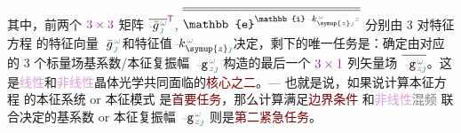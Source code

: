 其中，前两个 $\textcolor{Plum}{3 \times 3}$ 矩阵 $\overline{\xint{{}^{}_{\mathcolor{gray}{-}}}{10}{\bar{g}}^{\;\!\mathcolor{gray}{\omega}}_{\;\! \textcolor{PineGreen}{\jmath}}}^{\mathsf{\textcolor{Plum}{T}}}$, $\overline{\overline{\mathbb{e}^{\mathbb{i} \xint{\begin{smallmatrix} ~ \\ {}^{}_{\mathcolor{gray}{-}} \\ ~ \end{smallmatrix}}{15}{k}_{\symup{z} \textcolor{PineGreen}{\jmath}}^{\;\! \mathcolor{gray}{\omega}} \mathcolor{gray}{z}}}}$ 分别由 3 对\textcolor{PineGreen}{特征方程}  的\textcolor{PineGreen}{特征向量} $\xint{{}^{}_{\mathcolor{gray}{-}}}{10}{\bar{g}}^{\;\!\mathcolor{gray}{\omega}}_{\;\! \textcolor{PineGreen}{\jmath}}$和\textcolor{PineGreen}{特征值}$\xint{\begin{smallmatrix} ~ \\ {}^{}_{\mathcolor{gray}{-}} \\ ~ \end{smallmatrix}}{15}{k}_{\symup{z} \textcolor{PineGreen}{\jmath}}^{\;\! \mathcolor{gray}{\omega}}$决定，剩下的唯一任务是：确定由对应的 3 个标量场\textcolor{PineGreen}{基系数}/\textcolor{PineGreen}{本征复振幅} $\xint{\begin{smallmatrix} ~ \\ {}^{}_{\mathcolor{gray}{-}} \\ ~ \end{smallmatrix}}{09}{\mathtt{g}}^{\;\!\mathcolor{gray}{\omega}}_{\;\! \mathcolor{gray}{z} \textcolor{PineGreen}{\jmath}}$ 构造的最后一个 $\textcolor{Plum}{3 \times 1}$ 列矢量场 $\overline{\xint{\begin{smallmatrix} ~ \\ {}^{}_{\mathcolor{gray}{-}} \\ ~ \end{smallmatrix}}{09}{\mathtt{g}}^{\;\!\mathcolor{gray}{\omega}}_{\;\! \mathcolor{gray}{z} \textcolor{PineGreen}{\jmath}}}$。这是\textcolor{Plum}{线性}和\textcolor{Plum}{非线性}\textcolor{PineGreen}{晶体光学}共同面临的\textcolor{Maroon}{核心之二}。--- 也就是说，如果说计算\textcolor{PineGreen}{本征方程}  的\textcolor{PineGreen}{本征系统} or \textcolor{PineGreen}{本征模}式  是\textcolor{Maroon}{首要任务}，那么计算满足\textcolor{Maroon}{边界条件}  和\textcolor{Plum}{非线性}\textcolor{gray}{混频}  联合决定的\textcolor{PineGreen}{基系数} or \textcolor{PineGreen}{本征复振幅} $\xint{\begin{smallmatrix} ~ \\ {}^{}_{\mathcolor{gray}{-}} \\ ~ \end{smallmatrix}}{09}{\mathtt{g}}^{\;\!\mathcolor{gray}{\omega}}_{\;\! \mathcolor{gray}{z} \textcolor{PineGreen}{\jmath}}$ 则是\textcolor{Maroon}{第二紧急任务}。

